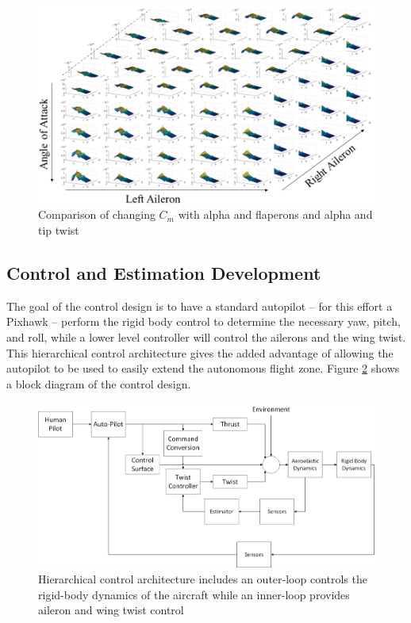 \documentclass[11pt]{ucthesis}
\begin{document}
\begin{figure}[thpb]
\centering
\includegraphics[width=1\linewidth]{Figures/DataCube.png}
\caption{Comparison of changing $C_m$ with alpha and flaperons and alpha and tip twist}
\label{fig:ADataCube}
\end{figure}

\subsection{Control and Estimation Development}
The goal of the control design is to have a standard autopilot – for this effort a Pixhawk – perform the rigid body control to determine the necessary yaw, pitch, and roll, while a lower level controller will control the ailerons and the wing twist. This hierarchical control architecture gives the added advantage of allowing the autopilot to be used to easily extend the autonomous flight zone. Figure \ref{fig:AControlBlockDiag} shows a block diagram of the control design.

\begin{figure}[thpb]
\centering
\includegraphics[width=1\linewidth]{Figures/Phase1Control.png}
\caption{Hierarchical control architecture includes an outer-loop controls the rigid-body dynamics of the aircraft while an inner-loop provides aileron and wing twist control}
\label{fig:AControlBlockDiag}
\end{figure}
\end{document}
